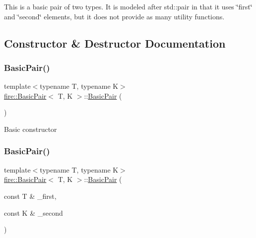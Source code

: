 This is a basic pair of two types. It is modeled after std\+::pair in that it uses \char`\"{}first\char`\"{} and \char`\"{}second\char`\"{} elements, but it does not provide as many utility functions. 

\subsection{Constructor \& Destructor Documentation}
\mbox{\label{a00768_a28eae46234d49126ac4727e7883174a4}} 
\subsubsection{\texorpdfstring{Basic\+Pair()}{BasicPair()}\hspace{0.1cm}{\footnotesize\ttfamily [1/2]}}
{\footnotesize\ttfamily template$<$typename T, typename K$>$ \\
\hyperlink{a00768}{fire\+::\+Basic\+Pair}$<$ T, K $>$\+::\hyperlink{a00768}{Basic\+Pair} (\begin{DoxyParamCaption}{ }\end{DoxyParamCaption})\hspace{0.3cm}{\ttfamily [inline]}}

Basic constructor \mbox{\label{a00768_ada8fa3f47bae245613d050598ac8488c}} 
\subsubsection{\texorpdfstring{Basic\+Pair()}{BasicPair()}\hspace{0.1cm}{\footnotesize\ttfamily [2/2]}}
{\footnotesize\ttfamily template$<$typename T, typename K$>$ \\
\hyperlink{a00768}{fire\+::\+Basic\+Pair}$<$ T, K $>$\+::\hyperlink{a00768}{Basic\+Pair} (\begin{DoxyParamCaption}\item[{const T \&}]{\+\_\+first,  }\item[{const K \&}]{\+\_\+second }\end{DoxyParamCaption})\hspace{0.3cm}{\ttfamily [inline]}}

